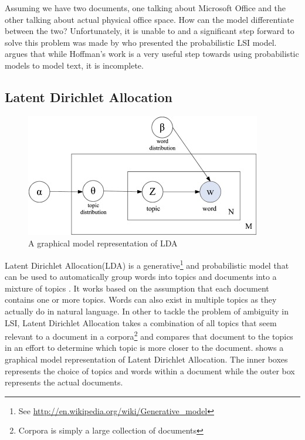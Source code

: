 Assuming we have two documents, one talking about Microsoft Office and the other talking about
actual physical office space. How can the model differentiate between the two? Unfortunately, it is
unable to and a significant step forward to solve this problem was made by
\citet{hofmann1999probabilistic} who presented the probabilistic LSI model. \citet{blei2003latent}
argues that while Hoffman's work is a very useful step towards using probabilistic models to model
text, it is incomplete.

\subsection{Latent Dirichlet Allocation}
\label{sec:bg-lda}

\begin{figure}[H]
\begin{center}
    \includegraphics[scale=1.5]{Figures/lda}
\end{center}
\caption{A graphical model representation of LDA}
\label{fig:lda}
\end{figure}

Latent Dirichlet Allocation(LDA) is a generative\footnote{See
\url{http://en.wikipedia.org/wiki/Generative_model}} and probabilistic model that can be used to
automatically group words into topics and documents into a mixture of topics \citep{blei2003latent}.
It works based on the assumption that each document contains one or more topics. Words can also
exist in multiple topics as they actually do in natural language. In other to tackle the problem of
ambiguity in LSI, Latent Dirichlet Allocation takes a combination of all topics that seem relevant
to a document in a corpora\footnote{Corpora is simply a large collection of documents} and compares
that document to the topics in an effort to determine which topic is more closer to the document.
 shows a graphical model representation of Latent Dirichlet Allocation. The inner
boxes represents the choice of topics and words within a document while the outer box represents the
actual documents.

